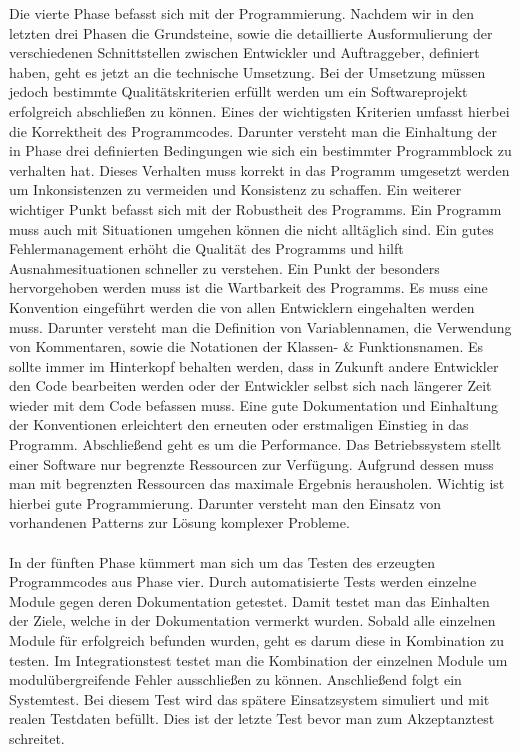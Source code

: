\documentclass{llncs}
\begin{document}
Die vierte Phase befasst sich mit der Programmierung. Nachdem wir in den letzten drei Phasen die Grundsteine, sowie die detaillierte Ausformulierung der verschiedenen Schnittstellen zwischen Entwickler und Auftraggeber, definiert haben, geht es jetzt an die technische Umsetzung. Bei der Umsetzung müssen jedoch bestimmte Qualitätskriterien erfüllt werden um ein Softwareprojekt erfolgreich abschließen zu können. Eines der wichtigsten Kriterien umfasst hierbei die Korrektheit des Programmcodes. Darunter versteht man die Einhaltung der in Phase drei definierten Bedingungen wie sich ein bestimmter Programmblock zu verhalten hat. Dieses Verhalten muss korrekt in das Programm umgesetzt werden um Inkonsistenzen zu vermeiden und Konsistenz zu schaffen. Ein weiterer wichtiger Punkt befasst sich mit der Robustheit des Programms. Ein Programm muss auch mit Situationen umgehen können die nicht alltäglich sind. Ein gutes Fehlermanagement erhöht die Qualität des Programms und hilft Ausnahmesituationen schneller zu verstehen. Ein Punkt der besonders hervorgehoben werden muss ist die Wartbarkeit des Programms. Es muss eine Konvention eingeführt werden die von allen Entwicklern eingehalten werden muss. Darunter versteht man die Definition von Variablennamen, die Verwendung von Kommentaren, sowie die Notationen der Klassen- \& Funktionsnamen. Es sollte immer im Hinterkopf behalten werden, dass in Zukunft andere Entwickler den Code bearbeiten werden oder der Entwickler selbst sich nach längerer Zeit wieder mit dem Code befassen muss. Eine gute Dokumentation und Einhaltung der Konventionen erleichtert den erneuten oder erstmaligen Einstieg in das Programm. Abschließend geht es um die Performance. Das Betriebssystem stellt einer Software nur begrenzte Ressourcen zur Verfügung. Aufgrund dessen muss man mit begrenzten Ressourcen das maximale Ergebnis herausholen. Wichtig ist hierbei gute Programmierung. Darunter versteht man den Einsatz von vorhandenen Patterns zur Lösung komplexer Probleme.
\\ \\
In der fünften Phase kümmert man sich um das Testen des erzeugten Programmcodes aus Phase vier. Durch automatisierte Tests werden einzelne Module gegen deren Dokumentation getestet. Damit testet man das Einhalten der Ziele, welche in der Dokumentation vermerkt wurden. Sobald alle einzelnen Module für erfolgreich befunden wurden, geht es darum diese in Kombination zu testen. Im Integrationstest testet man die Kombination der einzelnen Module um modulübergreifende Fehler ausschließen zu können. Anschließend folgt ein Systemtest. Bei diesem Test wird das spätere Einsatzsystem simuliert und mit realen Testdaten befüllt. Dies ist der letzte Test bevor man zum Akzeptanztest schreitet. 
\end{document}
